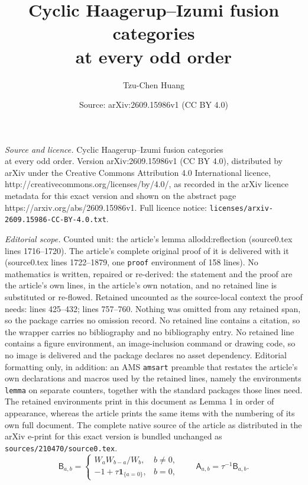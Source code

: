 \documentclass[10pt,a4paper]{amsart}
\title{Cyclic Haagerup--Izumi fusion categories\\at every odd order}
\author{Tzu-Chen Huang}
\date{Source: arXiv:2609.15986v1 (CC BY 4.0)}
\newcommand{\ind}[1]{\mathbf1_{\{#1\}}}
\begin{document}
\maketitle

\noindent\emph{Source and licence.} Cyclic Haagerup--Izumi fusion categories\\at every odd order. Version arXiv:2609.15986v1 (CC BY 4.0), distributed by arXiv under the Creative Commons Attribution 4.0 International licence, http://creativecommons.org/licenses/by/4.0/, as recorded in the arXiv licence metadata for this exact version and shown on the abstract page https://arxiv.org/abs/2609.15986v1. Full licence notice: \texttt{licenses/arxiv-2609.15986-CC-BY-4.0.txt}.\par\smallskip

\noindent\textit{Editorial scope.} Counted unit: the article's lemma allodd:reflection (source0.tex lines 1716--1720). The article's complete original proof of it is delivered with it (source0.tex lines 1722--1879, one \texttt{proof} environment of 158 lines). No mathematics is written, repaired or re-derived: the statement and the proof are the article's own lines, in the article's own notation, and no retained line is substituted or re-flowed.  Retained uncounted as the source-local context the proof needs: lines 425--432; lines 757--760.  Nothing was omitted from any retained span, so the package carries no omission record.  No retained line contains a citation, so the wrapper carries no bibliography and no bibliography entry.  No retained line contains a figure environment, an image-inclusion command or drawing code, so no image is delivered and the package declares no asset dependency.  Editorial formatting only, in addition: an AMS \texttt{amsart} preamble that restates the article's own declarations and macros used by the retained lines, namely the environments \texttt{lemma} on separate counters, together with the standard packages those lines need.  The retained environments print in this document as Lemma 1 in order of appearance, whereas the article prints the same items with the numbering of its own full document.  The complete native source of the article as distributed in the arXiv e-print for this exact version is bundled unchanged as \texttt{sources/210470/source0.tex}.
\begin{equation}\label{foundation:core}
 \mathsf B_{a,b}=
 \begin{cases}
  W_aW_{b-a}/W_b,&b\ne0,\\
  -1+\tau\ind{a=0},&b=0,
 \end{cases}
 \qquad \mathsf A_{a,b}=\tau^{-1}\mathsf B_{a,b}.
\end{equation}
\end{document}
